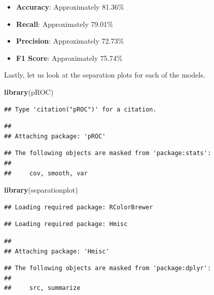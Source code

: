 \documentclass[
]{article}
\newenvironment{Shaded}{\begin{snugshade}}{\end{snugshade}}
\newcommand{\FunctionTok}[1]{\textcolor[rgb]{0.13,0.29,0.53}{\textbf{#1}}}
\newcommand{\NormalTok}[1]{#1}
\begin{document}
\begin{itemize}
\item
  \textbf{Accuracy}: Approximately 81.36\%
\item
  \textbf{Recall}: Approximately 79.01\%
\item
  \textbf{Precision}: Approximately 72.73\%
\item
  \textbf{F1 Score}: Approximately 75.74\%
\end{itemize}

Lastly, let us look at the separation plots for each of the models.

\begin{Shaded}
\begin{Highlighting}[]
\FunctionTok{library}\NormalTok{(pROC)}
\end{Highlighting}
\end{Shaded}

\begin{verbatim}
## Type 'citation("pROC")' for a citation.
\end{verbatim}

\begin{verbatim}
## 
## Attaching package: 'pROC'
\end{verbatim}

\begin{verbatim}
## The following objects are masked from 'package:stats':
## 
##     cov, smooth, var
\end{verbatim}

\begin{Shaded}
\begin{Highlighting}[]
\FunctionTok{library}\NormalTok{(separationplot)}
\end{Highlighting}
\end{Shaded}

\begin{verbatim}
## Loading required package: RColorBrewer
\end{verbatim}

\begin{verbatim}
## Loading required package: Hmisc
\end{verbatim}

\begin{verbatim}
## 
## Attaching package: 'Hmisc'
\end{verbatim}

\begin{verbatim}
## The following objects are masked from 'package:dplyr':
## 
##     src, summarize
\end{verbatim}
\end{document}
